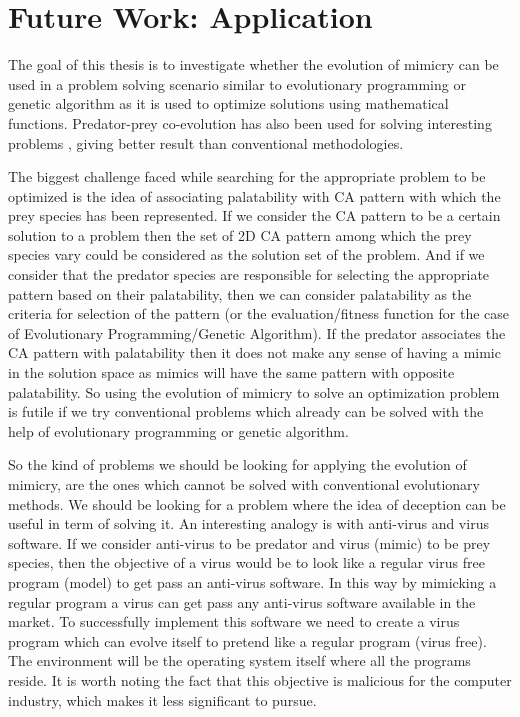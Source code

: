 \chapter{Future Work: Application}
\label{chapter:application}

The goal of this thesis is to investigate whether the evolution of mimicry can be used in a problem solving scenario similar to evolutionary programming or genetic algorithm as it is used to optimize solutions using mathematical functions. Predator-prey co-evolution has also been used for solving interesting problems \cite{hillis1990}, giving better result than conventional methodologies. 

The biggest challenge faced while searching for the appropriate problem to be optimized is the idea of associating palatability with CA pattern with which the prey species has been represented. If we consider the CA pattern to be a certain solution to a problem then the set of 2D CA pattern among which the prey species vary could be considered as the solution set of the problem. And if we consider that the predator species are responsible for selecting the appropriate pattern based on their palatability, then we can consider palatability as the criteria for selection of the pattern (or the evaluation/fitness function for the case of Evolutionary Programming/Genetic Algorithm). If the predator associates the CA pattern with palatability then it does not make any sense of having a mimic in the solution space as mimics will have the same pattern with opposite palatability. So using the evolution of mimicry to solve an optimization problem is futile if we try conventional problems which already can be solved with the help of evolutionary programming or genetic algorithm. 

So the kind of problems we should be looking for applying the evolution of mimicry, are the ones which cannot be solved with conventional evolutionary methods. We should be looking for a problem where the idea of deception can be useful in term of solving it. An interesting analogy is with anti-virus and virus software. If we consider anti-virus to be predator and virus (mimic) to be prey species, then the objective of a virus would be to look like a regular virus free program (model) to get pass an anti-virus software. In this way by mimicking a regular program a virus can get pass any anti-virus software available in the market. To successfully implement this software we need to create a virus program which can evolve itself to pretend like a regular program (virus free). The environment will be the operating system itself where all the programs reside. It is worth noting the fact that this objective is malicious for the computer industry, which makes it less significant to pursue. 